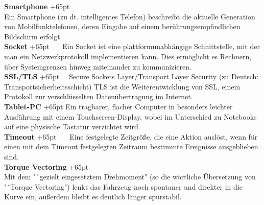 \documentclass[fontsize = 12pt, paper = a4]{scrreprt}
\begin{document}
\textbf{Smartphone}
\hangindent+65pt  \\
Ein Smartphone (zu dt. intelligentes Telefon) beschreibt die aktuelle Gene\-ration von Mobilfunktelefonen, deren Eingabe auf einem berührungsempfindlichen Bildschirm erfolgt.\\

\textbf{Socket}
\hangindent+65pt 
\ \ \ Ein Socket ist eine plattformunabhängige Schnittstelle, mit der man ein Netzwerkprotokoll implementieren kann. Dies ermöglicht es Rechnern, über Systemgrenzen hinweg miteinander zu kommunizieren.\\

\textbf{SSL/TLS}
\hangindent+65pt  
\ \ Secure Sockets Layer/Transport Layer Security (zu Deutsch: Transportsicherheitsschicht) TLS ist die Weiterentwicklung von SSL, einem Protokoll zur verschlüsselten Datenübertragung im Internet.\\

\textbf{Tablet-PC}
\hangindent+65pt  
Ein tragbarer, flacher Computer in besonders leichter Ausführung mit einem Touchscreen-Display, wobei im Unterschied zu Notebooks auf eine physische Tastatur verzichtet wird.\\

\textbf{Timeout}
\hangindent+65pt  
\ \ \ Eine festgelegte Zeitgröße, die eine Aktion auslöst, wenn für einen mit dem Timeout festgelegten Zeitraum bestimmte Ereignisse ausgeblieben sind.\\

\textbf{Torque Vectoring}
\hangindent+65pt  \\
Mit dem "`gezielt eingesetztem Drehmoment" (so die wörtliche Übersetzung von "`Torque Vectoring") lenkt das Fahrzeug noch spontaner und direkter in die Kurve ein, außerdem bleibt es deutlich länger spurstabil.\\
\end{document}
